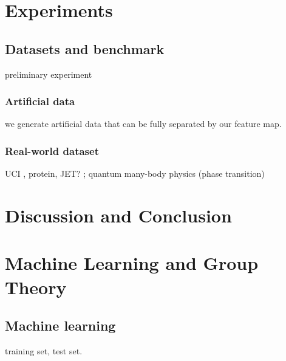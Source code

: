 \section{Experiments}\label{sec:experiments}

\subsection{Datasets and benchmark}
preliminary experiment

\subsubsection{Artificial data}
we generate artificial data that can be fully separated by our feature map.

\subsubsection{Real-world dataset}
UCI \cite{kondorDiffusionKernelsGraphs2002}, protein, JET? \cite{bogatskiyLorentzGroupEquivariant2020}; 
quantum many-body physics (phase transition)
\cite{carrasquillaMachineLearningPhases2017} 

\section{Discussion and Conclusion}\label{sec:discussion}

\printbibliography
\appendix

\section{Machine Learning and Group Theory}
\subsection{Machine learning}
training set, test set.

